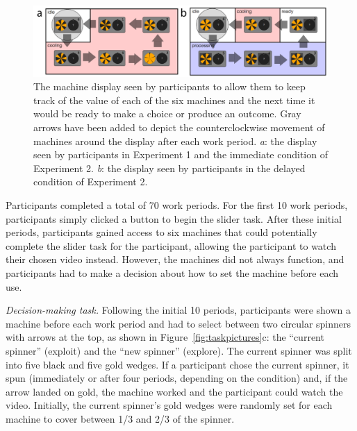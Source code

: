 \documentclass[10pt,letterpaper]{article}
\begin{document}
\begin{figure}
\centering
\includegraphics[width=\textwidth]{figures/machinemappictures.png}
\caption{The machine display seen by participants to allow them to keep track of
  the value of each of the six machines and the next time it would be ready to
  make a choice or produce an outcome. Gray arrows have been added to depict the
  counterclockwise movement of machines around the display after each work
  period.
  \emph{a}: the display seen by participants in Experiment 1 and the immediate condition of Experiment 2.
  \emph{b}: the display seen by participants in the delayed condition of
  Experiment 2.}
\label{fig:machinemappictures}
\end{figure}

Participants completed a total of 70 work
periods. For the first 10 work periods, participants simply clicked a button to begin the
slider task. After these initial periods, participants gained access to six
machines that could potentially complete the slider task for the participant,
allowing the participant to watch their chosen video instead. However, the
machines did not always function, and participants had to make a decision about
how to set the machine before each use.

\emph{Decision-making task.}
Following the initial 10 periods, participants were shown a machine before each work period and had to select
between two circular spinners with arrows at the top, as shown in Figure~\ref{fig:taskpictures}c: the ``current spinner''
(exploit) and the ``new spinner'' (explore).
The current spinner was split into
five black and five gold wedges. If a participant chose the
current spinner, it spun (immediately or after four periods, depending
on the condition) and, if the arrow landed on gold, the machine
worked and the participant could watch the video. Initially, the
current spinner's gold wedges were randomly set for each machine to cover between
1/3 and 2/3 of the spinner.
\end{document}
